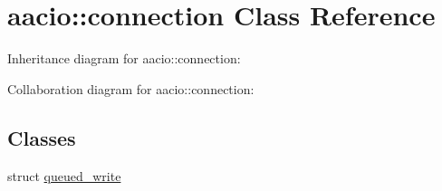 \hypertarget{classaacio_1_1connection}{}\section{aacio\+:\+:connection Class Reference}
\label{classaacio_1_1connection}


Inheritance diagram for aacio\+:\+:connection\+:


Collaboration diagram for aacio\+:\+:connection\+:
\subsection*{Classes}
\begin{DoxyCompactItemize}
\item 
struct \mbox{\hyperlink{structaacio_1_1connection_1_1queued__write}{queued\+\_\+write}}
\end{DoxyCompactItemize}
